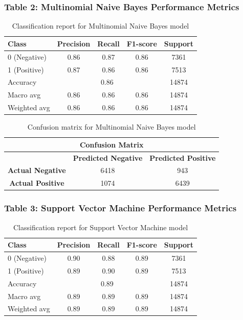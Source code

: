 \documentclass{article}
\begin{document}
\subsubsection{Table 2: Multinomial Naive Bayes Performance Metrics}
\begin{table}[H]
\centering
\begin{tabular}{|l|c|c|c|c|}
\hline
\textbf{Class} & \textbf{Precision} & \textbf{Recall} & \textbf{F1-score} & \textbf{Support} \\
\hline
0 (Negative) & 0.86 & 0.87 & 0.86 & 7361 \\
\hline
1 (Positive) & 0.87 & 0.86 & 0.86 & 7513 \\
\hline
\hline
Accuracy & \multicolumn{3}{c|}{0.86} & 14874 \\
\hline
Macro avg & 0.86 & 0.86 & 0.86 & 14874 \\
\hline
Weighted avg & 0.86 & 0.86 & 0.86 & 14874 \\
\hline
\end{tabular}
\caption{Classification report for Multinomial Naive Bayes model}
\end{table}

\begin{table}[H]
\centering
\begin{tabular}{|c|c|c|}
\hline
\multicolumn{3}{|c|}{\textbf{Confusion Matrix}} \\
\hline
\textbf{} & \textbf{Predicted Negative} & \textbf{Predicted Positive} \\
\hline
\textbf{Actual Negative} & 6418 & 943 \\
\hline
\textbf{Actual Positive} & 1074 & 6439 \\
\hline
\end{tabular}
\caption{Confusion matrix for Multinomial Naive Bayes model}
\end{table}

\subsubsection{Table 3: Support Vector Machine Performance Metrics}
\begin{table}[H]
\centering
\begin{tabular}{|l|c|c|c|c|}
\hline
\textbf{Class} & \textbf{Precision} & \textbf{Recall} & \textbf{F1-score} & \textbf{Support} \\
\hline
0 (Negative) & 0.90 & 0.88 & 0.89 & 7361 \\
\hline
1 (Positive) & 0.89 & 0.90 & 0.89 & 7513 \\
\hline
\hline
Accuracy & \multicolumn{3}{c|}{0.89} & 14874 \\
\hline
Macro avg & 0.89 & 0.89 & 0.89 & 14874 \\
\hline
Weighted avg & 0.89 & 0.89 & 0.89 & 14874 \\
\hline
\end{tabular}
\caption{Classification report for Support Vector Machine model}
\end{table}
\end{document}
